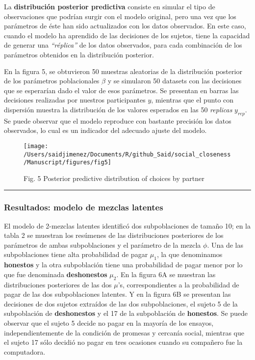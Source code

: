 \documentclass[12pt,]{article}
\begin{document}
La \textbf{distribución posterior predictiva} consiste en simular el
tipo de observaciones que podrían surgir con el modelo original, pero
una vez que los parámetros de éste han sido actualizados con los datos
observados. En este caso, cuando el modelo ha aprendido de las
decisiones de los sujetos, tiene la capacidad de generar una
\emph{``réplica''} de los datos observados, para cada combinación de los
parámetros obtenidos en la distribución posterior.

En la figura 5, se obtuvieron 50 muestras aleatorias de la distribución
posterior de los parámetros poblacionales \(\beta\) y se simularon 50
datasets con las decisiones que se esperarían dado el valor de esos
parámetros. Se presentan en barras las decisiones realizadas por
nuestros participantes \(y\), mientras que el punto con dispersión
muestra la distribución de los valores esperados en las 50
\emph{replicas} \(y_{rep}\). Se puede observar que el modelo reproduce
con bastante precisión los datos observados, lo cual es un indicador del
adecuado ajuste del modelo.

\begin{figure}

{\centering \texttt{[image: /Users/saidjimenez/Documents/R/github\_Said/social\_closeness/Manuscript/figures/fig5]} 

}

\caption{Fig. 5 Posterior predictive distribution of choices by partner}\label{fig:fig5}
\end{figure}

\begin{center}\rule{0.5\linewidth}{\linethickness}\end{center}

\subsubsection{Resultados: modelo de mezclas
latentes}\label{resultados-modelo-de-mezclas-latentes}

El modelo de 2-mezclas latentes identificó dos subpoblaciones de tamaño
10; en la tabla 2 se muestran los resúmenes de las distribuciones
posteriores de los parámetros de ambas subpoblaciones y el parámetro de
la mezcla \(\phi\). Una de las subpoblaciones tiene alta probabilidad de
pagar \(\mu_1\), la que denominamos \textbf{honestos} y la otra
subpoblación tiene una probabilidad de pagar menor por lo que fue
denominada \textbf{deshonestos} \(\mu_2\). En la figura 6A se muestran
las distribuciones posteriores de las dos \(\mu\)'s, correspondientes a
la probabilidad de pagar de las dos subpoblaciones latentes. Y en la
figura 6B se presentan las decisiones de dos sujetos extraídos de las
dos subpoblaciones, el sujeto 5 de la subpoblación de
\textbf{deshonestos} y el 17 de la subpoblación de \textbf{honestos}. Se
puede observar que el sujeto 5 decide no pagar en la mayoría de los
ensayos, independientemente de la condición de promesas y cercanía
social, mientras que el sujeto 17 sólo decidió no pagar en tres
ocasiones cuando su compañero fue la computadora.
\end{document}
